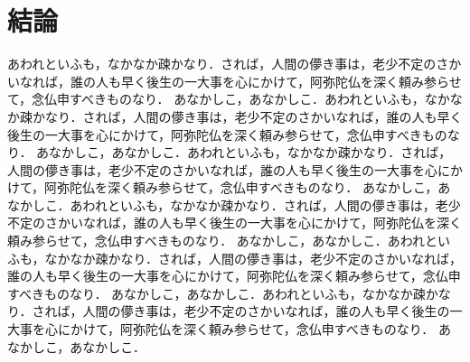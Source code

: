 

\chapter{結論}
あわれといふも，なかなか疎かなり．されば，人間の儚き事は，老少不定のさかいなれば，誰の人も早く後生の一大事を心にかけて，阿弥陀仏を深く頼み参らせて，念仏申すべきものなり． あなかしこ，あなかしこ．あわれといふも，なかなか疎かなり．されば，人間の儚き事は，老少不定のさかいなれば，誰の人も早く後生の一大事を心にかけて，阿弥陀仏を深く頼み参らせて，念仏申すべきものなり． あなかしこ，あなかしこ．あわれといふも，なかなか疎かなり．されば，人間の儚き事は，老少不定のさかいなれば，誰の人も早く後生の一大事を心にかけて，阿弥陀仏を深く頼み参らせて，念仏申すべきものなり． あなかしこ，あなかしこ．あわれといふも，なかなか疎かなり．されば，人間の儚き事は，老少不定のさかいなれば，誰の人も早く後生の一大事を心にかけて，阿弥陀仏を深く頼み参らせて，念仏申すべきものなり． あなかしこ，あなかしこ．あわれといふも，なかなか疎かなり．されば，人間の儚き事は，老少不定のさかいなれば，誰の人も早く後生の一大事を心にかけて，阿弥陀仏を深く頼み参らせて，念仏申すべきものなり． あなかしこ，あなかしこ．あわれといふも，なかなか疎かなり．されば，人間の儚き事は，老少不定のさかいなれば，誰の人も早く後生の一大事を心にかけて，阿弥陀仏を深く頼み参らせて，念仏申すべきものなり． あなかしこ，あなかしこ．
